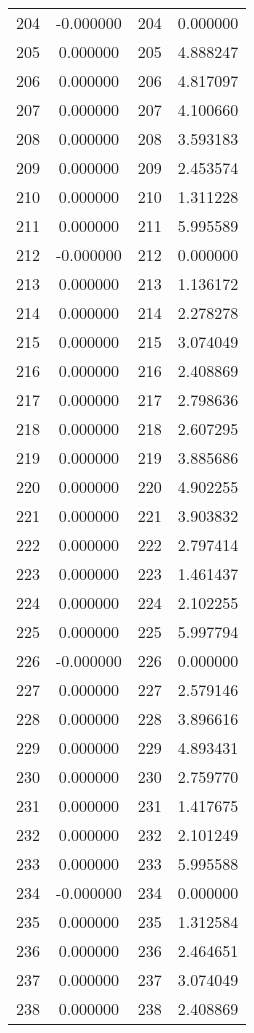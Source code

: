 \documentclass[12pt]{article}
\begin{document}
\begin{longtable}{@{}cccc@{}}
204 & -0.000000 & 204 & 0.000000 \\
205 & 0.000000 & 205 & 4.888247 \\
206 & 0.000000 & 206 & 4.817097 \\
207 & 0.000000 & 207 & 4.100660 \\
208 & 0.000000 & 208 & 3.593183 \\
209 & 0.000000 & 209 & 2.453574 \\
210 & 0.000000 & 210 & 1.311228 \\
211 & 0.000000 & 211 & 5.995589 \\
212 & -0.000000 & 212 & 0.000000 \\
213 & 0.000000 & 213 & 1.136172 \\
214 & 0.000000 & 214 & 2.278278 \\
215 & 0.000000 & 215 & 3.074049 \\
216 & 0.000000 & 216 & 2.408869 \\
217 & 0.000000 & 217 & 2.798636 \\
218 & 0.000000 & 218 & 2.607295 \\
219 & 0.000000 & 219 & 3.885686 \\
220 & 0.000000 & 220 & 4.902255 \\
221 & 0.000000 & 221 & 3.903832 \\
222 & 0.000000 & 222 & 2.797414 \\
223 & 0.000000 & 223 & 1.461437 \\
224 & 0.000000 & 224 & 2.102255 \\
225 & 0.000000 & 225 & 5.997794 \\
226 & -0.000000 & 226 & 0.000000 \\
227 & 0.000000 & 227 & 2.579146 \\
228 & 0.000000 & 228 & 3.896616 \\
229 & 0.000000 & 229 & 4.893431 \\
230 & 0.000000 & 230 & 2.759770 \\
231 & 0.000000 & 231 & 1.417675 \\
232 & 0.000000 & 232 & 2.101249 \\
233 & 0.000000 & 233 & 5.995588 \\
234 & -0.000000 & 234 & 0.000000 \\
235 & 0.000000 & 235 & 1.312584 \\
236 & 0.000000 & 236 & 2.464651 \\
237 & 0.000000 & 237 & 3.074049 \\
238 & 0.000000 & 238 & 2.408869 \\

\end{longtable}
\end{document}
